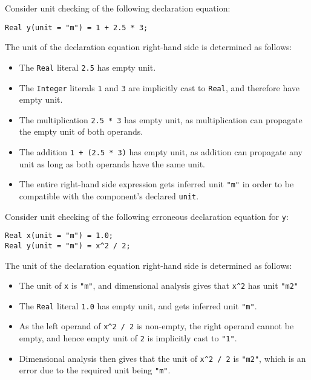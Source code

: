 \begin{example}
Consider unit checking of the following declaration equation:
\begin{lstlisting}[language=modelica]
Real y(unit = "m") = 1 + 2.5 * 3;
\end{lstlisting}
The unit of the declaration equation right-hand side is determined as follows:
\begin{itemize}
\item The \lstinline!Real! literal \lstinline!2.5! has empty unit.
\item The \lstinline!Integer! literals \lstinline!1! and \lstinline!3! are implicitly cast to \lstinline!Real!, and therefore have empty unit.
\item The multiplication \lstinline!2.5 * 3! has empty unit, as multiplication can propagate the empty unit of both operands.
\item The addition \lstinline!1 + (2.5 * 3)! has empty unit, as addition can propagate any unit as long as both operands have the same unit.
\item The entire right-hand side expression gets inferred unit \lstinline!"m"! in order to be compatible with the component's declared \lstinline!unit!.
\end{itemize}
\end{example}

\begin{example}
Consider unit checking of the following erroneous declaration equation for \lstinline!y!:
\begin{lstlisting}[language=modelica]
Real x(unit = "m") = 1.0;
Real y(unit = "m") = x^2 / 2;
\end{lstlisting}
The unit of the declaration equation right-hand side is determined as follows:
\begin{itemize}
\item The unit of \lstinline!x! is \lstinline!"m"!, and dimensional analysis gives that \lstinline!x^2! has unit \lstinline!"m2"!
\item The \lstinline!Real! literal \lstinline!1.0! has empty unit, and gets inferred unit \lstinline!"m"!.
\item As the left operand of \lstinline!x^2 / 2! is non-empty, the right operand cannot be empty, and hence empty unit of \lstinline!2! is implicitly cast to \lstinline!"1"!.
\item Dimensional analysis then gives that the unit of \lstinline!x^2 / 2! is \lstinline!"m2"!, which is an error due to the required unit being \lstinline!"m"!.
\end{itemize}
\end{example}

